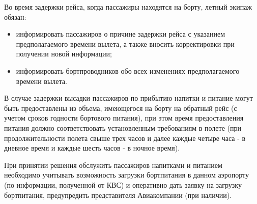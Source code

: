 Во время задержки рейса, когда пассажиры находятся на борту, летный экипаж обязан:
\begin{itemize}
    \item информировать пассажиров о причине задержки рейса с указанием предполагаемого времени вылета, а также вносить корректировки при получении новой информации;
    \item информировать бортпроводников обо всех изменениях предполагаемого времени вылета.
\end{itemize}

В случае задержки высадки пассажиров по прибытию напитки и питание могут быть предоставлены из объема, имеющегося на борту на обратный рейс (с учетом сроков годности бортового питания), при этом время предоставления питания должно соответствовать установленным требованиям в полете (при продолжительности полета свыше трех часов и далее каждые четыре часа - в дневное время и каждые шесть часов - в ночное время).

При принятии решения обслужить пассажиров напитками и питанием необходимо учитывать возможность загрузки бортпитания в данном аэропорту (по информации, полученной от КВС) и оперативно дать заявку на загрузку бортпитания, предупредить представителя Авиакомпании (при наличии).


